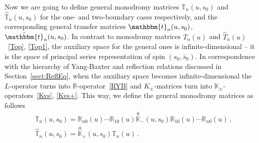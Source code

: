 \documentclass[a4paper,11pt]{article}
\numberwithin{equation}{section}
\begin{document}
Now we are going to define general monodromy matrices $\mathbb{T}_n(u,s_0)$ and $\hat{\mathbb{T}}_n(u,s_0)$ for the one- and two-boundary cases respectively, and the corresponding general transfer matrices $\mathbbm{t}_n(u,s_0)$, $\hat{\mathbbm{t}}_n(u,s_0)$.
In contrast to monodromy matrices $T_n(u)$ and $\hat{T}_n(u)$~\eqref{Top}, \eqref{Top1}, the auxiliary space for the general ones is infinite-dimensional -- it is the space of principal series representation of spin $(s_0,\bar{s}_0)$.
In correspondence with the hierarchy of Yang-Baxter and reflection relations discussed in Section~\ref{sect:ReflEq}, when the auxiliary space becomes infinite-dimensional the $L$-operator turns into $\mathbb{R}$-operator~\eqref{RYB} and $K_\pm$-matrices turn into $\mathbb{K}_\pm$-operators~\eqref{Kvs}, \eqref{Kvs+}.
This way, we define the general monodromy matrices as follows
\begin{align}
	\label{generalT}
	&\mathbb{T}_n(u,s_0) = \mathbb{R}_{n0}(u)\cdots \mathbb{R}_{10}(u)\overset{0}{\mathbb{K}}_-(u,s_0)\mathbb{R}_{10}(u)\cdots \mathbb{R}_{n0}(u) \,,\\
	\label{generalhatT}
	&\hat{\mathbb{T}}_n(u,s_0) = \overset{0}{\mathbb{K}}_+(u,s_0)\mathbb{T}_n(u) \,.
\end{align}
\end{document}
